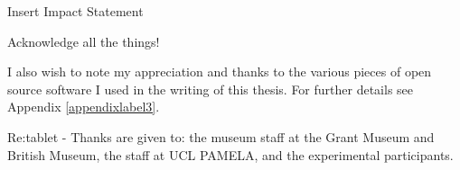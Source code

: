 \begin{impactstatement}

Insert Impact Statement

%
%
%
%
%
%
\end{impactstatement}

\begin{acknowledgements}
Acknowledge all the things!

I also wish to note my appreciation and thanks to the various pieces of open source software I used in the writing of this thesis. For further details see Appendix \ref{appendixlabel3}.

Re:tablet - Thanks are given to: the museum staff at the Grant Museum and British Museum, the staff at UCL PAMELA, and the experimental participants.

\end{acknowledgements}

\setcounter{tocdepth}{2} 

\tableofcontents
\listoffigures
\printglossary[type=\acronymtype,style=long]

